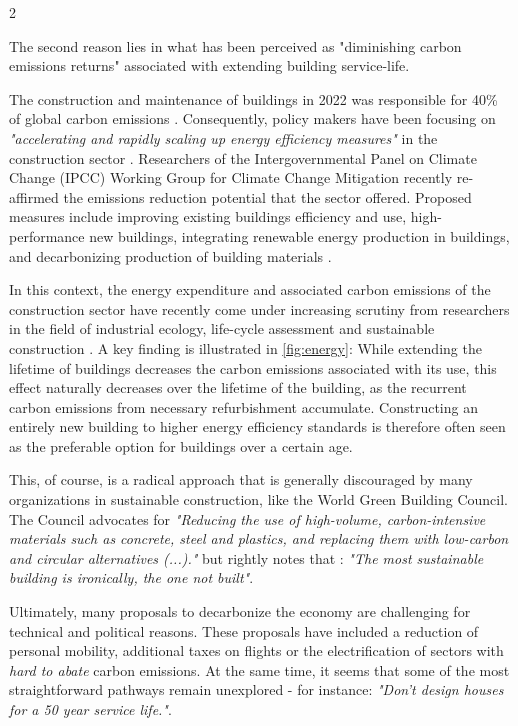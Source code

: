 \documentclass{article}
\begin{document}
\clearpage
\begin{multicols}{2}

The second reason lies in what has been perceived as "diminishing carbon emissions returns" associated with extending building service-life.

The construction and maintenance of buildings in 2022 was responsible for 40\% of global carbon emissions \cite{camarasa_energy_2023}. Consequently, policy makers have been focusing on \textit{"accelerating and rapidly scaling up energy efficiency measures"} in the construction sector \cite{noauthor_2022_2022}. Researchers of the Intergovernmental Panel on Climate Change (IPCC) Working Group for Climate Change Mitigation recently re-affirmed the emissions reduction potential that the sector offered. Proposed measures include improving existing buildings efficiency and use, high-performance new buildings, integrating renewable energy production in buildings, and decarbonizing production of building materials \cite{shukla_mitigation_2022}.

In this context, the energy expenditure and associated carbon emissions of the construction sector have recently come under increasing scrutiny from researchers in the field of industrial ecology, life-cycle assessment and sustainable construction \cite{chau_review_2015}\cite{ortiz_sustainability_2009}. A key finding is illustrated in \cref{fig:energy}: While extending the lifetime of buildings decreases the carbon emissions associated with its use, this effect naturally decreases over the lifetime of the building, as the recurrent carbon emissions from necessary refurbishment accumulate. Constructing an entirely new building to higher energy efficiency standards is therefore often seen as the preferable option for buildings over a certain age.

This, of course, is a radical approach that is generally discouraged by many organizations in sustainable construction, like the World Green Building Council. The Council advocates for \textit{"Reducing the use of high-volume, carbon-intensive materials such as concrete, steel and plastics, and replacing them with low-carbon and circular alternatives (...)."} \cite[Sec. 7.4]{noauthor_2022_2022} but rightly notes that : \textit{"The most sustainable building is ironically, the one not built"}.

Ultimately, many proposals to decarbonize the economy are challenging for technical and political reasons. These proposals have included a reduction of personal mobility, additional taxes on flights or the electrification of sectors with \textit{hard to abate} carbon emissions. At the same time, it seems that some of the most straightforward pathways remain unexplored - for instance: \textit{"Don't design houses for a 50 year service life."}.

\end{multicols}
\end{document}
